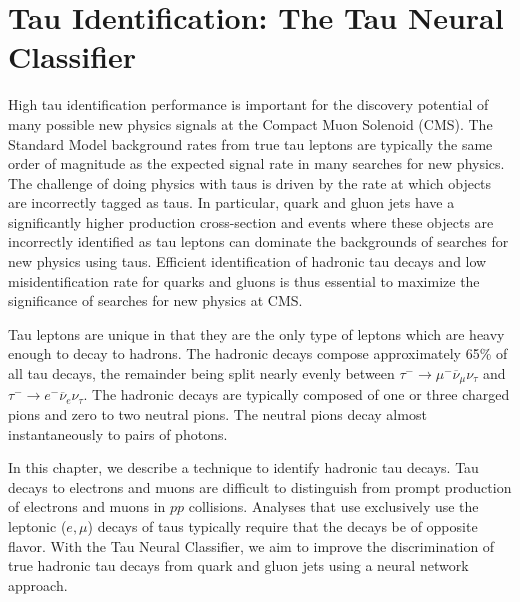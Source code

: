 \ifx\master\undefined\fi

\chapter{Tau Identification: The Tau Neural Classifier}
\label{ch:tanc}
%
High tau identification performance is important for the discovery potential of
many possible new physics signals at the Compact Muon Solenoid (CMS).  The
Standard Model background rates from true tau leptons are typically the same
order of magnitude as the expected signal rate in many searches for new
physics.  The challenge of doing physics with taus is driven by the rate at
which objects are incorrectly tagged as taus.  In particular, quark and gluon
jets have a significantly higher production cross-section and events where
these objects are incorrectly identified as tau leptons can dominate the
backgrounds of searches for new physics using taus.  Efficient identification
of hadronic tau decays and low misidentification rate for quarks and gluons
is thus essential to maximize the significance of searches for new physics at
CMS.

Tau leptons are unique in that they are the only type of leptons which are heavy
enough to decay to hadrons.  The hadronic decays compose approximately 65\% of
all tau decays, the remainder being split nearly evenly between $\tau^{-} \to
\mu^{-} \overline \nu_\mu \nu_\tau$ and $\tau^{-} \to e^{-} \overline \nu_e \nu_\tau$.
The hadronic decays are typically composed of one or three charged pions and
zero to two neutral pions.  The neutral pions decay almost instantaneously to
pairs of photons.

In this chapter, we describe a technique to identify hadronic tau decays.  Tau
decays to electrons and muons are difficult to distinguish from prompt
production of electrons and muons in $pp$ collisions.  Analyses that use
exclusively use the leptonic ($e,\mu$) decays of taus typically require that the
decays be of opposite flavor.  With the Tau Neural Classifier, we aim to improve
the discrimination of true hadronic tau decays from quark and gluon jets using a
neural network approach.

